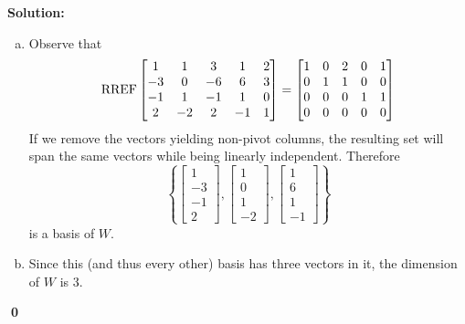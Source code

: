 \documentclass{article}
\newenvironment{solution}
{
  \ignorespaces
  \textbf{Solution:}
}
{
  \ignorespacesafterend
  \begin{flushright}
  {\bfseries \qed}
  \end{flushright}
}
\begin{document}
\begin{solution}
\begin{enumerate}[(a)]
\item Observe that
\[ \operatorname{RREF}
    \begin{bmatrix}
    1 & 1 & 3 & 1 & 2 \\
    -3 & 0 & -6 & 6 & 3 \\
    -1 & 1 & -1 & 1 & 0 \\
    2 & -2 & 2 & -1 & 1
    \end{bmatrix} =
    \begin{bmatrix}
    1 & 0 & 2 & 0 & 1 \\
    0 & 1 & 1 & 0 & 0 \\
    0 & 0 & 0 & 1 & 1 \\
    0 & 0 & 0 & 0 & 0
    \end{bmatrix}
\]
If we remove the vectors yielding non-pivot columns, the resulting
set will span the same vectors while being linearly independent.
Therefore
\[\left\{
  \begin{bmatrix} 1 \\ -3 \\ -1 \\ 2 \end{bmatrix} ,
  \begin{bmatrix} 1 \\ 0 \\ 1 \\ -2 \end{bmatrix} ,
  \begin{bmatrix} 1 \\ 6 \\ 1 \\ -1 \end{bmatrix}
  \right\}
\]
is a basis of \(W\). 
\item Since this (and thus every other) basis has three vectors in it, the dimension of \(W\) is \(3\).
\end{enumerate}
\end{solution}
\end{document}
